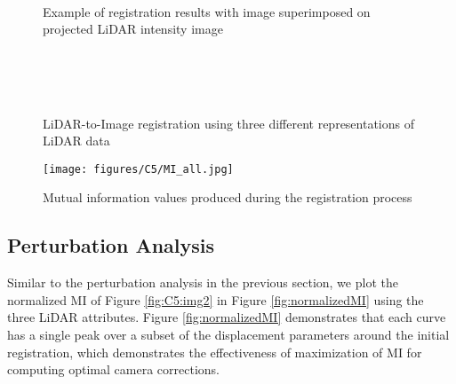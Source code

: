 \begin{figure}[H]
\centering
{} \\
\caption{Example of registration results with image superimposed on projected LiDAR intensity image} 
\label{fig:C5:Registration_example}
\end{figure}

\begin{figure}[H]
\centering
{} \\
\\
 \\
\caption{LiDAR-to-Image registration using three different representations of LiDAR data } 
\label{fig:C5:Registration_three_measures}
\end{figure}

\begin{figure}[H]
\centering
\texttt{[image: figures/C5/MI\_all.jpg]} \\
\caption{Mutual information values  produced during the registration process} 
\label{fig:C5:MI_Convergence}
\end{figure}

\subsection{Perturbation Analysis}

Similar to the perturbation analysis in the previous section, we plot the normalized MI of Figure \ref{fig:C5:img2} in Figure \ref{fig:normalizedMI} using the three LiDAR attributes. Figure \ref{fig:normalizedMI} demonstrates that each curve has a single peak over a subset of the displacement parameters around the initial registration, which demonstrates the effectiveness of maximization of MI for computing optimal camera corrections. 

